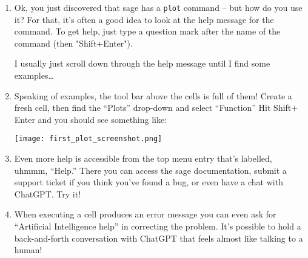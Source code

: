 \begin{enumerate}
\item Ok, you just discovered that sage has a \verb+plot+ command -- but how do you use it? For that, it's often a good idea to look at the help message for the command. To get help, just type a question mark after the name of the command (then "Shift+Enter").

\noindent I usually just scroll down through the help message until I find some examples\dots

\item Speaking of examples, the tool bar above the cells is full of them!  Create a fresh cell, then find the ``Plots'' drop-down and select ``Function''  Hit Shift$+$Enter and you should see something like:

\texttt{[image: first\_plot\_screenshot.png]}

\item Even more help is accessible from the top menu entry that's labelled, uhmmm, ``Help.''  There you can access the sage documentation, submit a support ticket if you think you've found a bug, or even have a chat with ChatGPT.  Try it!

\item When executing a cell produces an error message you can even ask for ``Artificial Intelligence help'' in correcting the problem.  It's possible to hold a back-and-forth conversation with ChatGPT that feels almost like talking to a human!
\end{enumerate}
